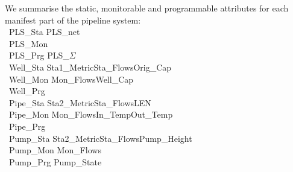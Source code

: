 



\noindent
\begynd
\pind We summarise the static, monitorable and programmable attributes
      for each manifest part of the pipeline system:
\afslut      
\bp
{}\\
\>\ PLS\_Sta {\EQ} PLS\_net{\TIMES}{\DOTDOTDOT}\\
\>\ PLS\_Mon {\EQ} {\DOTDOTDOT}\\
\>\ PLS\_Prg {\EQ} PLS\_$\Sigma${\TIMES}{\DOTDOTDOT}\\
\>\ Well\_Sta {\EQ} Sta1\_Metric{\TIMES}Sta\_Flows{\TIMES}Orig\_Cap{\TIMES}{\DOTDOTDOT}\\
\>\ Well\_Mon {\EQ} Mon\_Flows{\TIMES}Well\_Cap{\TIMES}{\DOTDOTDOT}\\
\>\ Well\_Prg {\EQ} {\DOTDOTDOT} \\
\>\ Pipe\_Sta {\EQ} Sta2\_Metric{\TIMES}Sta\_Flows{\TIMES}LEN{\TIMES}{\DOTDOTDOT}\\
\>\ Pipe\_Mon {\EQ} Mon\_Flows{\TIMES}In\_Temp{\TIMES}Out\_Temp{\TIMES}{\DOTDOTDOT}\\
\>\ Pipe\_Prg {\EQ} {\DOTDOTDOT}\ \ \\
\>\ Pump\_Sta {\EQ} Sta2\_Metric{\TIMES}Sta\_Flows{\TIMES}Pump\_Height{\TIMES}{\DOTDOTDOT}\\
\>\ Pump\_Mon {\EQ} Mon\_Flows{\TIMES}{\DOTDOTDOT}\\
\>\ Pump\_Prg {\EQ} Pump\_State{\TIMES}{\DOTDOTDOT}\\
